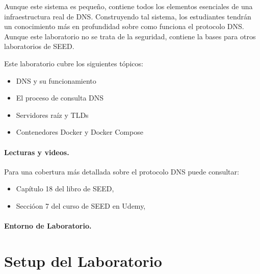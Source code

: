 Aunque este sistema es pequeño, contiene todos los elementos esenciales de una infraestructura real de DNS. Construyendo tal sistema, los estudiantes tendrán un conocimiento más en profundidad sobre como funciona el protocolo DNS.
Aunque este laboratorio no se trata de la seguridad, contiene la bases para otros laboratorios de SEED.

Este laboratorio cubre los siguientes tópicos:

\begin{itemize}[noitemsep]
\item DNS y su funcionamiento
\item El proceso de consulta DNS
\item Servidores raíz y TLDs
\item Contenedores Docker y Docker Compose
\end{itemize}



\paragraph{Lecturas y videos.}
Para una cobertura más detallada sobre el protocolo DNS puede consultar:

\begin{itemize}
\item Capítulo 18 del libro de SEED, \seedbook
\item Seccióon 7 del curso de SEED en Udemy, \seedisvideo
\end{itemize}


\paragraph{Entorno de Laboratorio.} 
\seedenvironmentB
\nodependency





\section{Setup del Laboratorio} 


